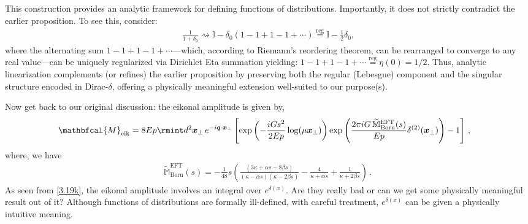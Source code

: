 \begin{tcolorbox}[thesisstatementbox, title=A digression on the functions of Dirac-$\delta$ function (measure)]
This construction provides an analytic framework for defining functions of distributions. Importantly, it does not strictly contradict the earlier proposition. To see this, consider:
\begin{align}
    \frac{1}{1+\delta_0} \rightsquigarrow \mathbb{I} - \delta_0 (1-1+1-1+\cdots) \overset{\text{reg}}{=} \mathbb{I} - \frac{1}{2}\delta_0,
    \label{3.23n}
\end{align}
where the alternating sum \(1-1+1-1+\cdots\)—which, according to Riemann’s reordering theorem, can be rearranged to converge to any real value—can be uniquely regularized via Dirichlet Eta summation yielding: $1-1+1-1+\cdots\overset{\text{reg}}{=}\eta(0)=1/2$. Thus, analytic linearization complements (or refines) the earlier proposition by preserving both the regular (Lebesgue) component and the singular structure encoded in Dirac-\(\delta\), offering a physically meaningful extension well-suited to our purpose(s).
\end{tcolorbox}
\restorethesisbodyformat
Now get back to our original discussion: the eikonal amplitude is given by,
\vspace{-0.3 cm}
\begin{align}
    \begin{split}
        \mathbfcal{M}_{\textrm{eik}}&
        =8Ep\rmint d^2 \boldsymbol{x}_{\perp}\,e^{-i \boldsymbol{q}\cdot \boldsymbol{x}_{\perp}}\left[\exp\left(-\frac{iGs^2}{2Ep}\log(\mu \boldsymbol{x}_{\perp})\right)\exp\left(\frac{2\pi i G\,\widetilde{\mathbb{M}}^{\textrm{EFT}}_{\textrm{Born}}(s)}{Ep}\delta^{(2)}(\boldsymbol{x}_{\perp})\right)-1\right]\,,    \label{3.19k}
        \end{split}
\end{align}
where, we have \begin {align}\widetilde{\mathbb{M}}^{\textrm{EFT}}_{\textrm{Born}}(s)=-\frac{1}{48} s \left(\frac{(3 \kappa+\alpha  s-8 \beta  s)}{(\kappa-\alpha  s) (\kappa-2 \beta  s)}-\frac{4}{\kappa+\alpha  s}+\frac{1}{\kappa+2 \beta s}\right)\,.\,
    \label{3.18p}\end{align}
As seen from \eqref{3.19k}, the eikonal amplitude involves an integral over \( e^{\delta(x)} \). Are they really bad or can we get some physically meaningful result out of it? Although functions of distributions are formally ill-defined, with careful treatment, \( e^{\delta(x)} \) can be given a physically intuitive meaning.
